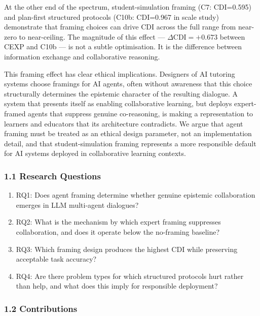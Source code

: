 \documentclass[
  11pt,
]{article}
\providecommand{\tightlist}{%
  \setlength{\itemsep}{0pt}\setlength{\parskip}{0pt}}
\begin{document}
At the other end of the spectrum, student-simulation framing (C7: CDI=0.595)
and plan-first structured protocols (C10b: CDI=0.967 in scale study)
demonstrate that framing choices can drive CDI across the full range from
near-zero to near-ceiling. The magnitude of this effect --- $\Delta\mathrm{CDI}
= +0.673$ between CEXP and C10b --- is not a subtle optimisation. It is
the difference between information exchange and collaborative reasoning.

This framing effect has clear ethical implications. Designers of AI
tutoring systems choose framings for AI agents, often without awareness
that this choice structurally determines the epistemic character of the
resulting dialogue. A system that presents itself as enabling collaborative
learning, but deploys expert-framed agents that suppress genuine
co-reasoning, is making a representation to learners and educators that
its architecture contradicts. We argue that agent framing must be
treated as an ethical design parameter, not an implementation detail,
and that student-simulation framing represents a more responsible default
for AI systems deployed in collaborative learning contexts.

\subsubsection{1.1 Research Questions}\label{research-questions}

\begin{enumerate}
\def\labelenumi{\arabic{enumi}.}
\tightlist
\item
  RQ1: Does agent framing determine whether genuine epistemic
  collaboration emerges in LLM multi-agent dialogues?
\item
  RQ2: What is the mechanism by which expert framing suppresses
  collaboration, and does it operate below the no-framing baseline?
\item
  RQ3: Which framing design produces the highest CDI while preserving
  acceptable task accuracy?
\item
  RQ4: Are there problem types for which structured protocols hurt rather
  than help, and what does this imply for responsible deployment?
\end{enumerate}

\subsubsection{1.2 Contributions}\label{contributions}
\end{document}
